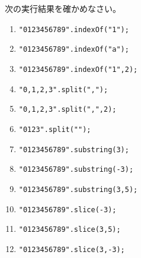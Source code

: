 \begin{Prob}\upshape
 次の実行結果を確かめなさい。
 \begin{enumerate}
	\item \texttt{"0123456789".indexOf("1");}
	\item \texttt{"0123456789".indexOf("a");}
	\item \texttt{"0123456789".indexOf("1",2);}
	\item \texttt{"0,1,2,3".split(",");}
	\item \texttt{"0,1,2,3".split(",",2);}
	\item \texttt{"0123".split("");}
	\item \texttt{"0123456789".substring(3);}
	\item \texttt{"0123456789".substring(-3);}
	\item \texttt{"0123456789".substring(3,5);}
	\item \texttt{"0123456789".slice(-3);}
	\item \texttt{"0123456789".slice(3,5);}
	\item \texttt{"0123456789".slice(3,-3);}
 \end{enumerate}
\end{Prob}
